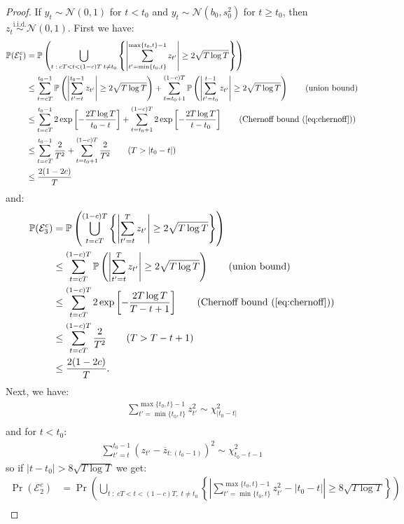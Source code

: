 \begin{proof}
If $y_t \sim \mathcal{N}(0,1)$ for $t < t_0$ and $y_t \sim \mathcal{N}(b_0,s^2_0)$ for $t \geq t_0$, then $z_t \overset{\text{i.i.d.}}{\sim} \mathcal{N}(0,1)$. First we have:
\small
\begin{align*}
    \Pr(\mathcal{E}^c_1) &= \Pr\left(\bigcup_{t \;:\; cT < t < (1-c)T\; t \neq t_0} \left\{\left|\sum_{t'=\min\{t_0,t\}}^{\max\{t_0,t\}-1} z_{t'}\right| \geq 2\sqrt{T \log T} \right\} \right) \\
    &\leq \sum_{t = cT}^{t_0 - 1} \Pr\left(\left|\sum_{t'=t}^{t_0-1} z_{t'}\right| \geq 2\sqrt{T \log T} \right) + \sum_{t = t_0+1}^{(1-c)T} \Pr\left(\left|\sum_{t'=t_0}^{t-1} z_{t'}\right| \geq 2\sqrt{T \log T} \right) \tag{union bound} \\
    &\leq \sum_{t = cT}^{t_0 - 1} 2\exp\left[-\frac{2 T\log T}{t_0-t}\right] + \sum_{t = t_0+1}^{(1-c)T} 2\exp\left[-\frac{2 T\log T}{t-t_0}\right] \tag{Chernoff bound (\ref{eq:chernoff})} \\
    &\leq \sum_{t = cT}^{t_0 - 1} \frac{2}{T^2}  + \sum_{t = t_0+1}^{(1-c)T} \frac{2}{T^2} \tag{$T > |t_0-t|$} \\
    &\leq \frac{2(1-2c)}{T}
\end{align*}
\normalsize
and:
\small
\begin{align*}
    \Pr(\mathcal{E}^c_3) &= \Pr\left(\bigcup_{t= cT}^{(1-c)T} \left\{\left|\sum_{t'=t}^T z_{t'}\right| \geq 2\sqrt{T \log T} \right\} \right) \\
    &\leq \sum_{t = cT}^{(1-c)T} \Pr\left(\left|\sum_{t'=t}^T z_{t'}\right| \geq 2\sqrt{T \log T} \right)\tag{union bound} \\
    &\leq \sum_{t = cT}^{(1-c)T}  2\exp\left[-\frac{2 T\log T}{T-t+1}\right] \tag{Chernoff bound (\ref{eq:chernoff})} \\
    &\leq \sum_{t = cT}^{(1-c)T}  \frac{2}{T^2}  \tag{$T > T-t+1$} \\
    &\leq \frac{2(1-2c)}{T}.
\end{align*}
\normalsize
Next, we have:
\begin{align*}
    \sum_{t'=\min\{t_0,t\}}^{\max\{t_0,t\}-1} z_{t'}^2 \sim \chi^2_{|t_0-t|} \\
\end{align*}
and for $t < t_0$:
\begin{align*}
    \sum_{t'=t}^{t_0-1} (z_{t'} - \overline{z}_{t:(t_0-1)})^2 \sim \chi^2_{t_0-t-1}
\end{align*}
so if $|t-t_0| > 8\sqrt{T\log T}$ we get:
\small
\begin{align*}
    \Pr(\mathcal{E}^c_2) &= \Pr\left(\bigcup_{t \;:\; cT < t < (1-c)T,\; t \neq t_0}  \left\{\left|\sum_{t'=\min\{t_0,t\}}^{\max\{t_0,t\}-1} z_{t'}^2 - |t_0-t| \right| \geq 8\sqrt{T \log T} \right\} \right) \\

\end{align*}
\end{proof}
